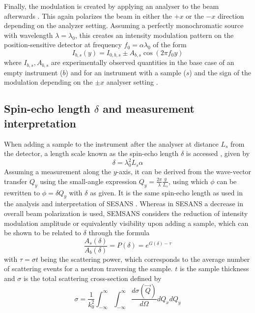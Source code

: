 \documentclass{article}
\begin{document}
Finally, the modulation is created by applying an analyser to the beam afterwards \cite{mezei1972}. This again polarizes the beam in either the $+x$ or the $-x$ direction depending on the analyzer setting. Assuming a perfectly monochromatic source with wavelength $\lambda = \lambda_0$, this creates an intensity modulation pattern on the position-sensitive detector at frequency $f_0 = \alpha\lambda_0$ of the form
\begin{equation}
	I_{b,s}(y) = I_{0, b,s} \pm A_{b,s}\cos(2\pi f_0y) \label{eq:mono-modulation}
\end{equation}
where $I_{b,s}, A_{b,s}$ are experimentally observed quantities in the base case of an empty instrument ($b$) and for an instrument with a sample ($s$) and the sign of the modulation depending on the $\pm x$ analyser setting \cite{parnell2023}. 
\subsection{Spin-echo length $\delta$ and measurement interpretation}
\label{c2.3}
When adding a sample to the instrument after the analyser at distance $L_s$ from the detector, a length scale known as the spin-echo length $\delta$ is accessed \cite{bouwman2011}, given by 
\begin{equation}
	\delta = \lambda_0^2L_s\alpha \label{eq:delta}
\end{equation}
Assuming a measurement along the $y$-axis, it can be derived from the wave-vector transfer $Q_y$ using the small-angle expression $Q_y = \frac{2\pi}{\lambda}\frac{y}{L_s}$, using which $\phi$ can be rewritten to $\phi = \delta Q_y$ with $\delta$ as given. It is the same spin-echo length as used in the analysis and interpretation of SESANS \cite{rekveldt1996}\cite{krouglov2003}\cite{andersson2008}. Whereas in SESANS a decrease in overall beam polarization is used, SEMSANS considers the reduction of intensity modulation amplitude or equivalently visibility upon adding a sample, which can be shown to be related to $\delta$ through the formula \cite{parnell2023}
\begin{equation}
	\frac{A_s(\delta)}{A_b(\delta)} = P(\delta) = e^{G(\delta) - \tau} \label{eq:sample-pol-reduction}
\end{equation}
with $\tau = \sigma t$ being the scattering power, which corresponds to the average number of scattering events for a neutron traversing the sample. $t$ is the sample thickness and $\sigma$ is the total scattering cross-section defined by 
\begin{equation}
	\sigma = \frac{1}{k_0^2}\int_{-\infty}^\infty\int_{-\infty}^\infty\dfrac{d\sigma(\vec{Q})}{d\Omega}dQ_xdQ_y  \label{eq:sigma-analytical}
\end{equation}
\end{document}
